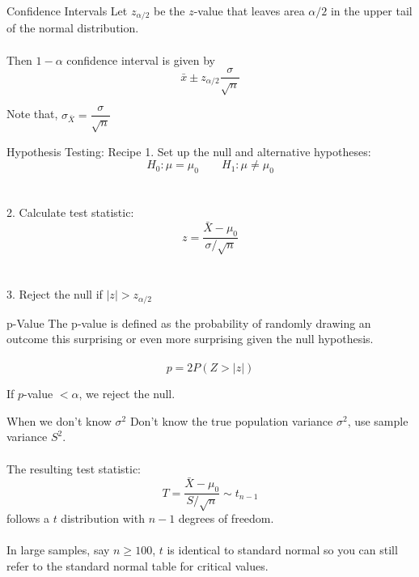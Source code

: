 \documentclass{./../div_teaching_slides}
\begin{document}
\begin{frame}{Confidence Intervals}
Let $z_{\alpha/2}$ be the $z$-value that leaves area $\alpha/2$ in the upper tail of the normal distribution. \\~\\
Then $1-\alpha$ confidence interval is given by 
$$ \bar{x} \pm {z_{\alpha/2}  \frac{\sigma}{\sqrt{n}}}$$

Note that, $\sigma_{\bar{X}} = \dfrac{\sigma}{\sqrt{n}}$
\end{frame}

\begin{frame}{Hypothesis Testing: Recipe}
1. Set up the null and alternative hypotheses:
$$ H_0: \mu = \mu_0 \quad \quad H_1: \mu \neq \mu_0$$ \\~\\
2. Calculate test statistic:
$$z =  \frac{\bar{X} - \mu_0}{\sigma/\sqrt{n}}$$ \\~\\
3. Reject the null if $|z|>z_{\alpha/2}$
\end{frame}

\begin{frame}{p-Value}
The p-value is defined as the probability of randomly drawing an outcome this surprising or even more surprising given the null hypothesis. \\~\\
$$ p = 2 P(Z>|z|) $$

\vspace{1cm}
If $p$-value $ <\alpha$, we reject the null.

\end{frame}

\begin{frame}{When we don't know $\sigma^2$}
	Don't know the true population variance $\sigma^2$, use sample variance $S^2$. \\~\\ 
	The resulting test statistic:
	$$ T = \frac{\bar{X}-\mu_0}{S/\sqrt{n}} \sim t_{n-1} $$ 
follows a $t$ distribution with $n-1$ degrees of freedom. \\~\\
In large samples, say $n \geq 100$, $t$ is identical to standard normal so you can still refer to the standard normal table for critical values. 
\end{frame}
\end{document}
